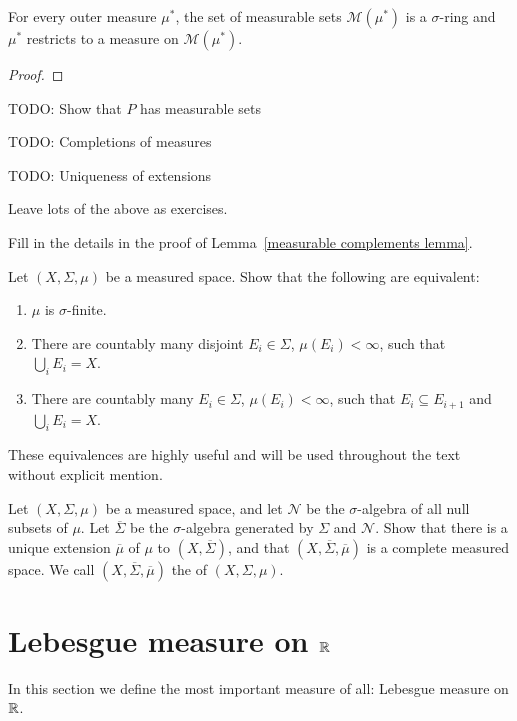 \begin{lemma}
For every outer measure $\mu^*$, the set of measurable sets $\mathcal M(\mu^*)$ is a $\sigma$-ring and $\mu^*$ restricts to a measure on $\mathcal M(\mu^*)$.
\end{lemma}
\begin{proof}

\end{proof}



TODO: Show that $P$ has measurable sets

TODO: Completions of measures

TODO: Uniqueness of extensions

Leave lots of the above as exercises.

\begin{exercise}
\label{measurable complements}
Fill in the details in the proof of Lemma~\ref{measurable complements lemma}.
\end{exercise}

\begin{exercise}
Let $(X, \Sigma, \mu)$ be a measured space. Show that the following are equivalent:
\begin{enumerate}
\item $\mu$ is $\sigma$-finite.
\item There are countably many disjoint $E_{i} \in \Sigma$, $\mu(E_i) < \infty$, such that $\bigcup_{i} E_{i} = X$.
\item There are countably many $E_{i} \in \Sigma$, $\mu(E_i) < \infty$, such that $E_{i} \subseteq E_{i+1}$ and $\bigcup_{i} E_{i} = X$.
\end{enumerate}
These equivalences are highly useful and will be used throughout the text without explicit mention.
\end{exercise}

\begin{exercise}
Let $(X, \Sigma, \mu)$ be a measured space, and let $\mathcal N$ be the $\sigma$-algebra of all null subsets of $\mu$. Let $\overline \Sigma$ be the $\sigma$-algebra generated by $\Sigma$ and $\mathcal N$.
Show that there is a unique extension $\overline \mu$ of $\mu$ to $(X, \overline \Sigma)$, and that $(X, \overline \Sigma, \overline \mu)$ is a complete measured space.
We call $(X, \overline \Sigma, \overline \mu)$ the  of $(X, \Sigma, \mu)$.
\end{exercise}

\section{Lebesgue measure on $\mathbb{R}$}
In this section we define the most important measure of all: Lebesgue measure on $\mathbb{R}$.


